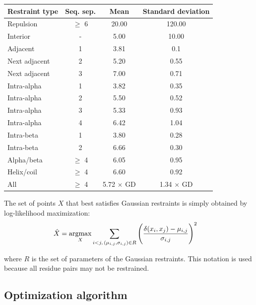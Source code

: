     \begin{table}[H]
        \centering
        \begin{tabular}{|l|c|c|c|}
            \hline
            Restraint type & Seq. sep. & Mean & Standard deviation \\
            \hline
            \hline
            Repulsion     & $\ge$ 6 & 20.00 & 120.00 \\
            Interior      & - & 5.00 & 10.00 \\
            Adjacent      & 1 & 3.81 & 0.1  \\
            Next adjacent & 2 & 5.20 & 0.55 \\
            Next adjacent & 3 & 7.00 & 0.71 \\
            Intra-alpha   & 1 & 3.82 & 0.35 \\
            Intra-alpha   & 2 & 5.50 & 0.52 \\
            Intra-alpha   & 3 & 5.33 & 0.93 \\
            Intra-alpha   & 4 & 6.42 & 1.04 \\
            Intra-beta    & 1 & 3.80 & 0.28 \\
            Intra-beta    & 2 & 6.66 & 0.30 \\
            Alpha/beta    & $\ge$ 4 & 6.05 & 0.95 \\
            Helix/coil    & $\ge$ 4 & 6.60 & 0.92 \\
            All & $\ge$ 4 & 5.72 $\times$ GD & 1.34 $\times$ GD \\
            \hline
        \end{tabular}
        \label{restraints}
    \end{table}

    The set of points $X$ that best satisfies Gaussian restraints is simply
    obtained by log-likelihood maximization:
    \begin{align}
        \hat{X} & = \operatorname*{argmax}_{X} \sum\limits_{i < j ,\, (\mu_{i,j}, \sigma_{i,j}) \in R}
            \Bigg(\frac{\delta(x_i, x_j) - \mu_{i,j}}{\sigma_{i,j}}\Bigg)^2
    \end{align}

    where $R$ is the set of parameters of the Gaussian restraints. This notation is used
    because all residue pairs may not be restrained.

  \subsection{Optimization algorithm}

